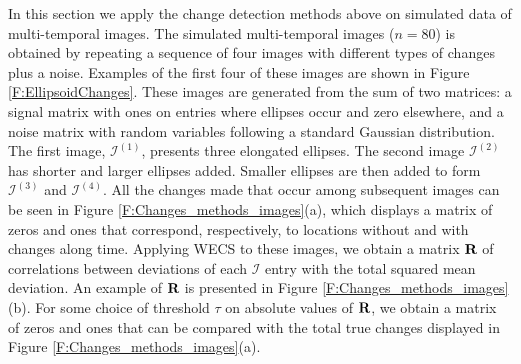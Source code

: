 \documentclass[journal]{IEEEtran}
\newcommand{\vR}{{\textbf R}}
\begin{document}
In this section we apply the change detection methods above on simulated data of multi-temporal images. The simulated multi-temporal images ($n=80$) is obtained by repeating a sequence of four images with different types of changes plus a noise. Examples of the first four of these images are shown in Figure \ref{F:EllipsoidChanges}. These images are generated from the sum of two matrices: a signal matrix with ones on entries where ellipses occur and zero elsewhere, and a noise matrix with random variables following a standard Gaussian distribution. The first image, $\mathcal{I}^{(1)}$, presents three elongated ellipses. The second image $\mathcal{I}^{(2)}$ has shorter and larger ellipses added. Smaller ellipses are then added to form $\mathcal{I}^{(3)}$ and $\mathcal{I}^{(4)}$. All the changes made that occur among subsequent images can be seen in Figure \ref{F:Changes_methods_images}(a), which displays a matrix of zeros and ones that correspond, respectively, to locations without and with changes along time. Applying WECS to these images, we obtain a matrix $\vR$ of correlations between deviations of each $\mathcal{I}$ entry with the total squared mean deviation. An example of $\vR$ is presented in Figure \ref{F:Changes_methods_images}(b). For some choice of threshold $\tau$ on absolute values of $\vR$, we obtain a matrix of zeros and ones that can be compared with the total true changes displayed in Figure \ref{F:Changes_methods_images}(a).
\end{document}
